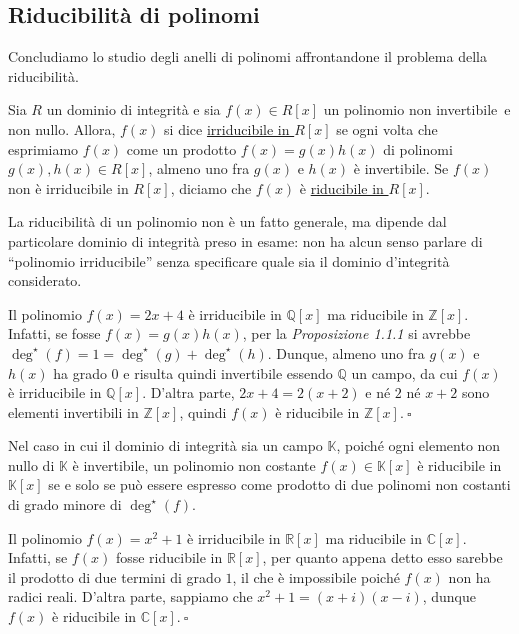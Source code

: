 
\subsection{Riducibilità di polinomi}

Concludiamo lo studio degli anelli di polinomi affrontandone il problema della riducibilità.

\begin{defn}[]{}
Sia $R$ un dominio di integrità e sia $f(x)\in R[x]$ un polinomio non invertibile\footnotemark\, e non nullo. Allora, $f(x)$ si dice \underline{irriducibile in $R[x]$} se ogni volta che esprimiamo $f(x)$ come un prodotto $f(x)=g(x)h(x)$ di polinomi $g(x),h(x)\in R[x]$, almeno uno fra $g(x)$ e $h(x)$ è invertibile. Se $f(x)$ non è irriducibile in $R[x]$, diciamo che $f(x)$ è \underline{riducibile in $R[x]$}.
\end{defn}

\noindent La riducibilità di un polinomio non è un fatto generale, ma dipende dal particolare dominio di integrità preso in esame: non ha alcun senso parlare di ``polinomio irriducibile'' senza specificare quale sia il dominio d'integrità considerato.

\begin{exm}Il polinomio $f(x)=2x+4$ è irriducibile in $\mathbb{Q}[x]$ ma riducibile in $\mathbb{Z}[x]$. Infatti, se fosse $f(x)=g(x)h(x)$, per la \emph{Proposizione 1.1.1} si avrebbe $\deg^{\star}(f)=1=\deg^{\star}(g)+\deg^{\star}(h)$. Dunque, almeno uno fra $g(x)$ e $h(x)$ ha grado $0$ e risulta quindi invertibile essendo $\mathbb{Q}$ un campo, da cui $f(x)$ è irriducibile in $\mathbb{Q}[x]$. D'altra parte, $2x+4=2(x+2)$ e né $2$ né $x+2$ sono elementi invertibili in $\mathbb{Z}[x]$, quindi $f(x)$ è riducibile in $\mathbb{Z}[x]. \ \square$\end{exm}

\noindent Nel caso in cui il dominio di integrità sia un campo $\mathbb{K}$, poiché ogni elemento non nullo di $\mathbb{K}$ è invertibile, un polinomio non costante $f(x)\in \mathbb{K}[x]$ è riducibile in $\mathbb{K}[x]$ se e solo se può essere espresso come prodotto di due polinomi non costanti di grado minore di $\deg^{\star}(f)$.

\begin{exm}Il polinomio $f(x)=x^2+1$ è irriducibile in $\mathbb{R}[x]$ ma riducibile in $\mathbb{C}[x]$. Infatti, se $f(x)$ fosse riducibile in $\mathbb{R}[x]$, per quanto appena detto esso sarebbe il prodotto di due termini di grado $1$, il che è impossibile poiché $f(x)$ non ha radici reali. D'altra parte, sappiamo che $x^2+1=(x+i)(x-i)$, dunque $f(x)$ è riducibile in $\mathbb{C}[x]. \ \square$\end{exm}

